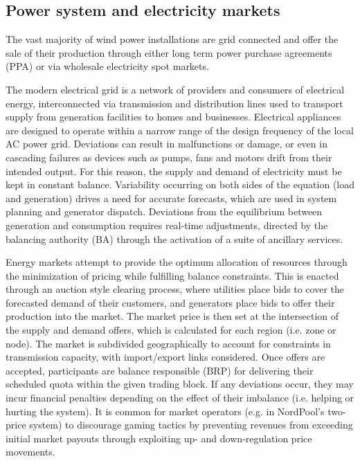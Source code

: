 \clearpage
\subsection{Power system and electricity markets}
\label{sec:intro_power_markets}

The vast majority of wind power installations are grid connected and offer the sale of their production through either long term power purchase agreements (PPA) or via wholesale electricity spot markets.

The modern electrical grid is a network of providers and consumers of electrical energy, interconnected via transmission and distribution lines used to transport supply from generation facilities to homes and businesses. Electrical appliances are designed to operate within a narrow range of the design frequency of the local AC power grid. Deviations can result in malfunctions or damage, or even in cascading failures as devices such as pumps, fans and motors drift from their intended output. For this reason, the supply and demand of electricity must be kept in constant balance. Variability occurring on both sides of the equation (load and generation) drives a need for accurate forecasts, which are used in system planning and generator dispatch. Deviations from the equilibrium between generation and consumption requires real-time adjustments, directed by the balancing authority (BA) through the activation of a suite of ancillary services.

Energy markets attempt to provide the optimum allocation of resources through the minimization of pricing while fulfilling balance constraints. This is enacted through an auction style clearing process, where utilities place bids to cover the forecasted demand of their customers, and generators place bids to offer their production into the market. The market price is then set at the intersection of the supply and demand offers, which is calculated for each region (i.e. zone or node). The market is subdivided geographically to account for constraints in transmission capacity, with import/export links considered. Once offers are accepted, participants are balance responsible (BRP) for delivering their scheduled quota within the given trading block. If any deviations occur, they may incur financial penalties depending on the effect of their imbalance (i.e. helping or hurting the system). It is common for market operators (e.g. in NordPool's two-price system) to discourage gaming tactics by preventing revenues from exceeding initial market payouts through exploiting up- and down-regulation price movements.

